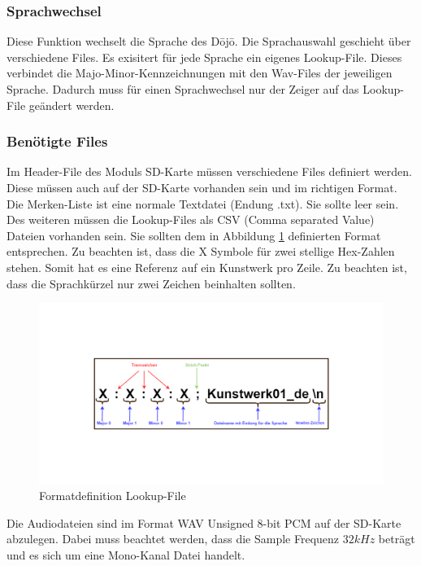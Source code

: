 \subsubsection*{Sprachwechsel}
Diese Funktion wechselt die Sprache des Dōjō. Die Sprachauswahl geschieht über verschiedene Files. Es exisitert für jede Sprache ein eigenes Lookup-File. Dieses verbindet die Majo-Minor-Kennzeichnungen mit den Wav-Files der jeweiligen Sprache. Dadurch muss für einen Sprachwechsel nur der Zeiger auf das Lookup-File geändert werden.

\subsubsection{Benötigte Files}
Im Header-File des Moduls SD-Karte müssen verschiedene Files definiert werden. Diese müssen auch auf der SD-Karte vorhanden sein und im richtigen Format. Die Merken-Liste ist eine normale Textdatei (Endung .txt). Sie sollte leer sein. Des weiteren müssen die Lookup-Files als CSV (Comma separated Value) Dateien vorhanden sein. Sie sollten dem in Abbildung \ref{fig:definition_lookup_file} definierten Format entsprechen. Zu beachten ist, dass die X Symbole für zwei stellige Hex-Zahlen stehen. Somit hat es eine Referenz auf ein Kunstwerk pro Zeile. Zu beachten ist, dass die Sprachkürzel nur zwei Zeichen beinhalten sollten.

\begin{figure}[H]
	\begin{center}
		\includegraphics[width=140mm]{data/Definition_picture.png}
		\caption[Formatdefinition Lookup-File]{Formatdefinition Lookup-File} %
		\label{fig:definition_lookup_file}
	\end{center}
\end{figure}

Die Audiodateien sind im Format WAV Unsigned 8-bit PCM auf der SD-Karte abzulegen. Dabei muss beachtet werden, dass die Sample Frequenz $32 kHz$ beträgt und es sich um eine Mono-Kanal Datei handelt. 
